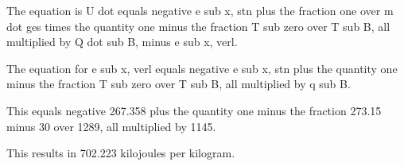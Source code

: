The equation is U dot equals negative e sub x, stn plus the fraction one over m dot ges times the quantity one minus the fraction T sub zero over T sub B, all multiplied by Q dot sub B, minus e sub x, verl.

The equation for e sub x, verl equals negative e sub x, stn plus the quantity one minus the fraction T sub zero over T sub B, all multiplied by q sub B.

This equals negative 267.358 plus the quantity one minus the fraction 273.15 minus 30 over 1289, all multiplied by 1145.

This results in 702.223 kilojoules per kilogram.